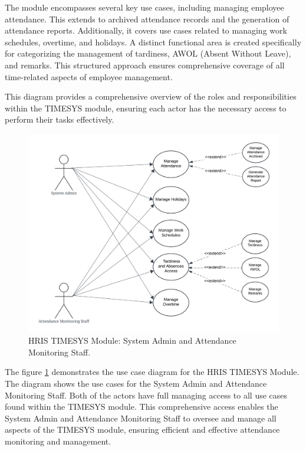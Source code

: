     The module encompasses several key use cases, including managing employee attendance. This extends to archived attendance records and the generation of attendance reports. Additionally, it covers use cases related to managing work schedules, overtime, and holidays. A distinct functional area is created specifically for categorizing the management of tardiness, AWOL (Absent Without Leave), and remarks. This structured approach ensures comprehensive coverage of all time-related aspects of employee management.

    This diagram provides a comprehensive overview of the roles and responsibilities within the TIMESYS module, ensuring each actor has the necessary access to perform their tasks effectively.
    
    \begin{figure}[H]
        \centering
        \includegraphics[width=0.9\linewidth]{figures/images/use-case-time-1.png}
        \caption{HRIS TIMESYS Module: System Admin and Attendance Monitoring Staff.}
        \label{fig:use-case-time-1}
    \end{figure}

    The figure \ref{fig:use-case-time-1} demonstrates the use case diagram for the HRIS TIMESYS Module. The diagram shows the use cases for the System Admin and Attendance Monitoring Staff. Both of the actors have full managing access to all use cases found within the TIMESYS module. This comprehensive access enables the System Admin and Attendance Monitoring Staff to oversee and manage all aspects of the TIMESYS module, ensuring efficient and effective attendance monitoring and management.


